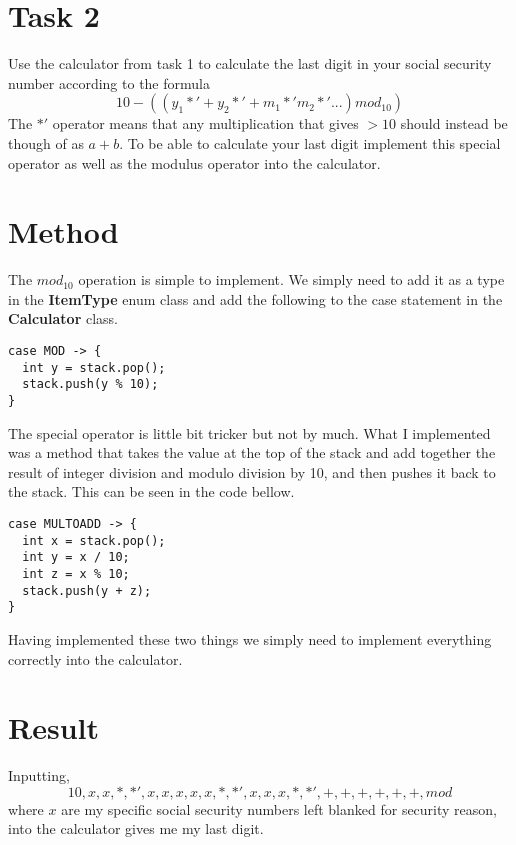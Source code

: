 \documentclass[a4paper,11pt]{article}
\begin{document}
\section*{Task 2}

Use the calculator from task 1 to calculate the last digit in your social security number
according to the formula
\[ 10 - \left( (y_1 *'+y_2*' +m_1*'m_2*'...)mod_{10} \right) \]
The $*'$ operator means that any multiplication that gives $>10$ should instead be though of as
$a+b$. To be able to calculate your last digit implement this special operator as well as
the modulus operator into the calculator.

\section*{Method}

The $mod_{10}$ operation is simple to implement. We simply need to add it as a type in the
\textbf{ItemType} enum class and add the following to the case statement in the
\textbf{Calculator} class.

\begin{verbatim}
case MOD -> {
  int y = stack.pop();
  stack.push(y % 10);
}
\end{verbatim}

The special operator is little bit tricker but not by much. What I implemented was a method
that takes the value at the top of the stack and add together the result of integer division
and modulo division by 10, and then pushes it back to the stack. This can be seen in the code
bellow.

\begin{verbatim}
case MULTOADD -> {
  int x = stack.pop();
  int y = x / 10;
  int z = x % 10;
  stack.push(y + z);
} 
\end{verbatim}

Having implemented these two things we simply need to implement everything correctly
into the calculator.
\section*{Result}
Inputting,
\[
  10,x,x,*,*',x,x,x,x,x,*,*',x,x,x,*,*',+,+,+,+,+,+,mod
\]
where $x$ are my specific social security numbers left blanked for security reason, into the
calculator gives me my last digit.
\end{document}

